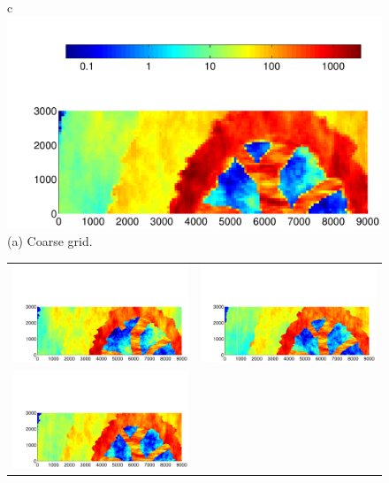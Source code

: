 \begin{figure}
\begin{tabular}{c}
\includegraphics[trim=1.2cm 0cm 0cm 0cm, clip=true,width=0.8\linewidth]{./figurer/permxc}\\(a) Coarse grid.\\
\begin{minipage}{1\textwidth}
\begin{tabular}{cc}
\includegraphics[trim=0.5cm 0cm 0cm 2.5cm, clip=true,width=0.5 \linewidth]
{./figurer/fineSat1}&
\includegraphics[trim=0.5cm 0cm 0cm 2.5cm, clip=true,width=0.5 \linewidth]
{./figurer/fineSat2}\\
\includegraphics[trim=0.5cm 0cm 0cm 2.5cm, clip=true,width=0.5 \linewidth]
{./figurer/fineSat3}&
\includegraphics[trim=0.5cm 0cm 0cm 2.5cm, clip=true,width=0.5 \linewidth]

\end{tabular}
\end{minipage}
\end{tabular}
\end{figure}
